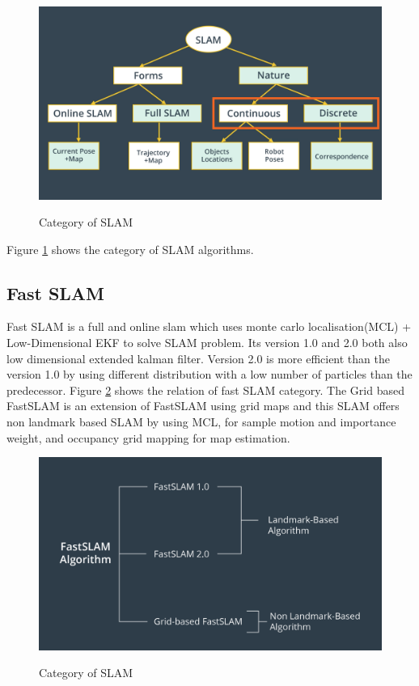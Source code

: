 \documentclass[10pt,journal,compsoc]{IEEEtran}
\begin{document}
\begin{figure}[thpb]
      \centering
      \includegraphics[width=\linewidth]{./img/CSLAM.jpg}
      \caption{Category of SLAM}
      \label{fig:CSLAM}
      \cite{Thrun2002}
\end{figure}

Figure \ref{fig:CSLAM} shows the category of SLAM algorithms.

\subsection{Fast SLAM}
Fast SLAM is a full and online slam which uses monte carlo localisation(MCL) + Low-Dimensional EKF to solve SLAM problem. Its version 1.0 and 2.0 both also low dimensional extended kalman filter. Version 2.0 is more efficient than the version 1.0 by using different distribution with a low number of particles than the predecessor. 
Figure \ref{fig:FastSLAM} shows the relation of fast SLAM category. The Grid based FastSLAM is an extension of FastSLAM using grid maps and this SLAM offers non landmark based SLAM by using MCL, for sample motion and importance weight, and occupancy grid mapping for map estimation.

\begin{figure}[thpb]
      \centering
      \includegraphics[width=\linewidth]{./img/FastSLAM.png}
      \caption{Category of SLAM}
      \label{fig:FastSLAM}
      \cite{Thrun2002}
\end{figure}
\end{document}
